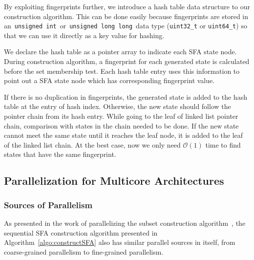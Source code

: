 \documentclass[10pt, conference, compsocconf]{IEEEtran}
\begin{document}
By exploiting fingerprints further, we introduce a hash table data
structure to our construction algorithm. This can be done easily
because fingerprints are stored in an~{\tt unsigned int}~or~{\tt unsigned long long}~data type
({\tt uint32\_t} or {\tt uint64\_t}) so that we can use it directly
as a key value for hashing.

\iffalse
\begin{figure}[htp]
\centering
\texttt{[image: figures/Hashing\_detail]}
\caption{Hash table}
\label{fig:hash}
\end{figure}

Figure~\ref{fig:hash} shows how the hash table works. 
\fi
We declare the hash table as
a pointer array to indicate each SFA state node. During
construction algorithm, a fingerprint for each generated state is
calculated before the set membership test. Each hash table entry uses this
information to point out a SFA state node which has corresponding
fingerprint value.
\iffalse
In the above example, hash table size is 10 and
hash table entry $i$ will point out the first SFA state that has
fingerprint value $g$ as $g$~mod~$10 = i$.
\fi

If there is no duplication in fingerprints, the generated state is
added to the hash table at the entry of hash index. Otherwise,
the new state should follow the pointer chain from its hash entry.
While going to the leaf of linked list pointer chain, comparison with
states in the chain needed to be done. If the new state cannot meet
the same state until it reaches the leaf node, it is added to the leaf
of the linked list chain. At the best case, now we only need $\mathcal{O}(1)$ time
to find states that have the same fingerprint.


\subsection{Parallelization for Multicore Architectures}
\label{sec:parallelOnMulti}

\subsubsection{Sources of Parallelism}
\label{subsubsec:parSources}
As presented in the work of parallelizing the subset
construction algorithm~\cite{Choi2013}, the sequential SFA construction
algorithm presented in Algorithm~\ref{algo:constructSFA} also has
similar parallel sources in itself, from coarse-grained parallelism to
fine-grained parallelism.
\end{document}
